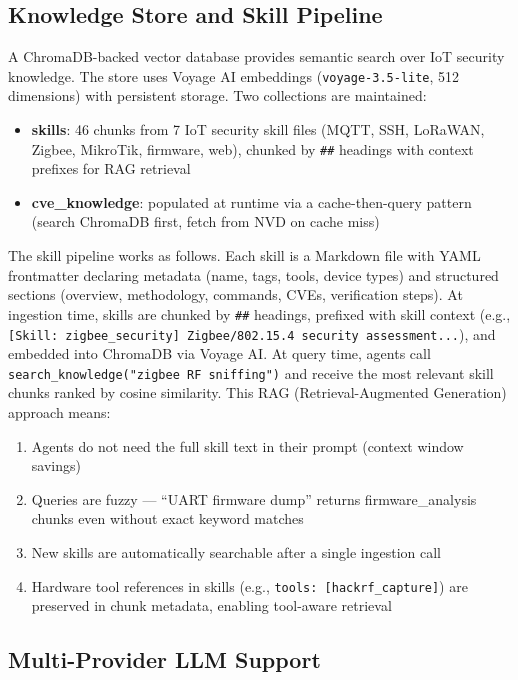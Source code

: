 \documentclass[11pt,a4paper]{article}
\begin{document}
\subsection{Knowledge Store and Skill Pipeline}

A ChromaDB-backed vector database provides semantic search over IoT security knowledge. The store uses Voyage AI embeddings (\texttt{voyage-3.5-lite}, 512 dimensions) with persistent storage. Two collections are maintained:

\begin{itemize}
    \item \textbf{skills}: 46 chunks from 7 IoT security skill files (MQTT, SSH, LoRaWAN, Zigbee, MikroTik, firmware, web), chunked by \texttt{\#\#} headings with context prefixes for RAG retrieval
    \item \textbf{cve\_knowledge}: populated at runtime via a cache-then-query pattern (search ChromaDB first, fetch from NVD on cache miss)
\end{itemize}

The skill pipeline works as follows. Each skill is a Markdown file with YAML frontmatter declaring metadata (name, tags, tools, device types) and structured sections (overview, methodology, commands, CVEs, verification steps). At ingestion time, skills are chunked by \texttt{\#\#} headings, prefixed with skill context (e.g., \texttt{[Skill: zigbee\_security] Zigbee/802.15.4 security assessment...}), and embedded into ChromaDB via Voyage AI. At query time, agents call \texttt{search\_knowledge("zigbee RF sniffing")} and receive the most relevant skill chunks ranked by cosine similarity. This RAG (Retrieval-Augmented Generation) approach means:

\begin{enumerate}
    \item Agents do not need the full skill text in their prompt (context window savings)
    \item Queries are fuzzy --- ``UART firmware dump'' returns firmware\_analysis chunks even without exact keyword matches
    \item New skills are automatically searchable after a single ingestion call
    \item Hardware tool references in skills (e.g., \texttt{tools: [hackrf\_capture]}) are preserved in chunk metadata, enabling tool-aware retrieval
\end{enumerate}

\subsection{Multi-Provider LLM Support}
\end{document}
